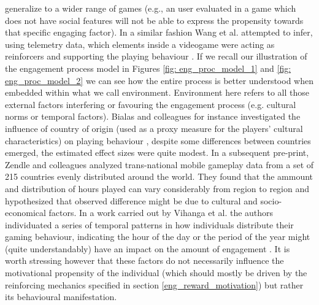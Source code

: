 generalize to a wider range of games (e.g., an user evaluated in a game which does not have social features will not be able to express the propensity towards that specific engaging factor). In a similar fashion Wang et al. attempted to infer, using telemetry data, which elements inside a videogame were acting as reinforcers and supporting the playing behaviour \cite{wang2018beyond}. If we recall our illustration of the engagement process model in Figures \ref{fig: eng_proc_model_1} and \ref{fig: eng_proc_model_2} we can see how the entire process is better understood when embedded within what we call environment. Environment here refers to all those external factors interfering or favouring the engagement process (e.g. cultural norms or temporal factors). Bialas and colleagues for instance investigated the influence of country of origin (used as a proxy measure for the players’ cultural characteristics) on playing behaviour \cite{bialas2014cultural}, despite some differences between countries emerged, the estimated effect sizes were quite modest.
In a subsequent pre-print, Zendle and colleagues \cite{zendle2022transnational} analyzed trans-national mobile gameplay data from a set of 215 countries evenly distributed around the world. They found that the ammount and distribution of hours played can vary considerably from region to region and hypothesized that observed difference might be due to cultural and socio-economical factors. In a work carried out by Vihanga et al. the authors individuated a series of temporal patterns in how individuals distribute their gaming behaviour, indicating the hour of the day or the period of the year might (quite understandably) have an impact on the amount of engagement \cite{vihanga2019weekly}. It is worth stressing however that these factors do not necessarily influence the motivational propensity of the individual (which should mostly be driven by the reinforcing mechanics specified in section \ref{eng_reward_motivation}) but rather its behavioural manifestation.

